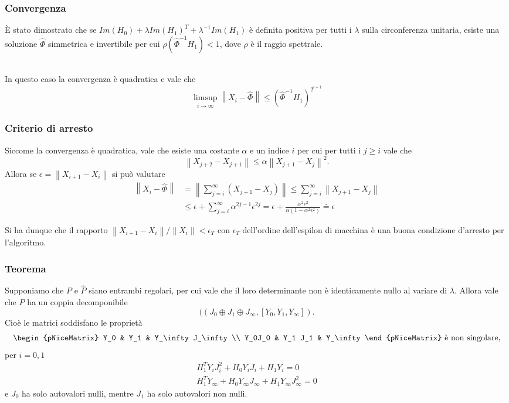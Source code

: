 \documentclass{beamer}
\newcommand{\norm}[1]{\left\lVert#1\right\rVert}
\begin{document}
\begin{frame}
\frametitle{Convergenza}
    \`E stato dimostrato che se $Im(H_0)+\lambda Im(H_1)^T +
    \lambda^{-1}Im(H_1)$ \`e definita positiva per tutti i $\lambda$ sulla
    circonferenza unitaria, esiste una soluzione $\hat{\Phi}$ simmetrica e
    invertibile per cui $\rho(\hat{\Phi}^{-1}H_1) < 1$, dove $\rho$ \`e il
    raggio spettrale. \\~\

    In questo caso la convergenza \`e quadratica e vale che
    \[
        \limsup_{i\rightarrow\infty} \norm{X_i-\hat{\Phi}} \leq
        (\hat{\Phi}^{-1}H_1)^{2^{i+1}}
    \]
\end{frame}

\begin{frame}
\frametitle{Criterio di arresto}
    Siccome la convergenza \`e quadratica, vale che esiste una costante $\alpha$
    e un indice $i$ per cui per tutti i $j\geq i$ vale che
    \[
        \norm{X_{j+2}-X_{j+1}}\leq \alpha \norm{X_{j+1}-X_j}^2.
    \]
    Allora se $\epsilon = \norm{X_{i+1}-X_i}$ si pu\`o valutare
    \begin{align*}
        \norm{X_i-\hat{\Phi}} &= \norm{\sum_{j=i}^{\infty} (X_{j+1}-X_j)} \leq
        \sum_{j=i}^{\infty} \norm{X_{j+1}-X_j} \\
        &\leq \epsilon + \sum_{j=i}^\infty \alpha^{2j-1} \epsilon^{2j} =
        \epsilon + \frac{\alpha^2\epsilon^2}{\alpha(1-\alpha^2\epsilon^2)}
        \doteq \epsilon
    \end{align*}

    Si ha dunque che il rapporto $\norm{X_{i+1}-X_i}/\norm{X_i}<\epsilon_T$ con
    $\epsilon_T$ dell'ordine dell'espilon di macchina \`e una buona condizione
    d'arresto per l'algoritmo.
\end{frame}

\begin{frame}
\frametitle{Teorema}
    Supponiamo che $P$ e $\hat{P}$ siano entrambi regolari, per cui vale che il
    loro determinante non \`e identicamente nullo al variare di $\lambda$.
    Allora vale che $\hat{P}$ ha un coppia decomponibile
    \[
        ((J_0\oplus J_1 \oplus J_\infty, [Y_0, Y_1, Y_\infty]).
    \]
    Cio\`e le matrici soddisfano le propriet\`a
    \[
        \begin{pNiceMatrix}
            Y_0 & Y_1 & Y_\infty J_\infty \\
            Y_0J_0 & Y_1 J_1 & Y_\infty
        \end{pNiceMatrix}
        \text{ \`e non singolare},
    \]
    per $i=0,1$
    \begin{align*}
        H_1^T Y_i J_i^2 + H_0 Y_iJ_i + H_1 Y_i=0 \\
        H_1^T Y_\infty + H_0 Y_\infty J_\infty + H_1 Y_\infty J_\infty^2 = 0
    \end{align*}
    e $J_0$ ha solo autovalori nulli, mentre $J_1$ ha solo autovalori non nulli.
\end{frame}
\end{document}
